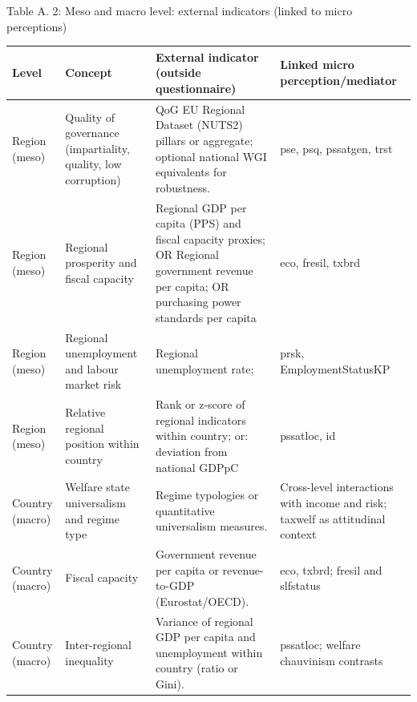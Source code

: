 \documentclass[12pt]{article}
\begin{document}
Table A. 2: Meso and macro level: external indicators (linked to micro
perceptions)

\begin{longtable}[]{@{}
  >{\raggedright\arraybackslash}p{}
  >{\raggedright\arraybackslash}p{}
  >{\raggedright\arraybackslash}p{}
  >{\raggedright\arraybackslash}p{}@{}}
\toprule\noalign{}
\begin{minipage}[b]{\linewidth}\raggedright
Level
\end{minipage} & \begin{minipage}[b]{\linewidth}\raggedright
Concept
\end{minipage} & \begin{minipage}[b]{\linewidth}\raggedright
External indicator (outside questionnaire)
\end{minipage} & \begin{minipage}[b]{\linewidth}\raggedright
Linked micro perception/mediator
\end{minipage} \\
\midrule\noalign{}
\endhead
\bottomrule\noalign{}
\endlastfoot
Region (meso) & Quality of governance (impartiality, quality, low
corruption) & QoG EU Regional Dataset (NUTS2) pillars or aggregate;
optional national WGI equivalents for robustness. & pse, psq, pssatgen,
trst \\
Region (meso) & Regional prosperity and fiscal capacity & Regional GDP
per capita (PPS) and fiscal capacity proxies; OR Regional government
revenue per capita; OR purchasing power standards per capita & eco,
fresil, txbrd \\
Region (meso) & Regional unemployment and labour market risk & Regional
unemployment rate; & prsk, EmploymentStatusKP \\
Region (meso) & Relative regional position within country & Rank or
z-score of regional indicators within country; or: deviation from
national GDPpC & pssatloc, id \\
Country (macro) & Welfare state universalism and regime type & Regime
typologies or quantitative universalism measures. & Cross-level
interactions with income and risk; taxwelf as attitudinal context \\
Country (macro) & Fiscal capacity & Government revenue per capita or
revenue-to-GDP (Eurostat/OECD). & eco, txbrd; fresil and slfstatus \\
Country (macro) & Inter-regional inequality & Variance of regional GDP
per capita and unemployment within country (ratio or Gini). & pssatloc;
welfare chauvinism contrasts \\
\end{longtable}
\end{document}
